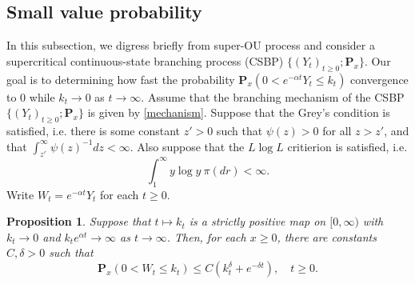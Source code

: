 \documentclass[12pt,a4paper]{amsart}
\theoremstyle{plain}
\newtheorem{prop}[thm]{Proposition}
\theoremstyle{definition}
\numberwithin{equation}{section}
\begin{document}
\subsection{Small value probability}
    In this subsection, we digress briefly from super-OU process and consider a supercritical continuous-state branching process (CSBP)
        $\{(Y_t)_{t\geq 0}; \mathbf P_x\}$.
    Our goal is to determining how fast the probability $\mathbf P_x(0<e^{-\alpha t}Y_t \leq k_t)$ convergence to $0$ while $k_t \to 0$ as $t\to \infty$.
   Assume that the branching mechanism of the CSBP $\{(Y_t)_{t\geq 0}; \mathbf P_x\}$ is given by \eqref{mechanism}.
    Suppose that the Grey's condition is satisfied, i.e. there is some constant $z' > 0$ such that $\psi(z) > 0$ for all $z>z'$, and that $\int_{z'}^\infty \psi(z)^{-1}dz < \infty$.
    Also suppose that the $L \log L$ critierion is satisfied, i.e.
\[
    \int_1^\infty y \log y~\pi(dr)< \infty.
\]
    Write $W_t = e^{-\alpha t}Y_t$ for each $t\geq 0$.
\begin{prop}
\label{lem: control of XT}
    Suppose that $t\mapsto k_t$ is a strictly positive map on $[0,\infty)$ with $k_t \to 0$ and $k_t e^{\alpha t} \to \infty$ as $t\to \infty$.
    Then, for each $x\geq 0$, there are constants $C,\delta>0$ such that
\[
    \mathbf P_x(0<W_t\leq k_t) \leq C(k_t^\delta + e^{-\delta t}), \quad t\geq 0.
\]
\end{prop}
\end{document}
